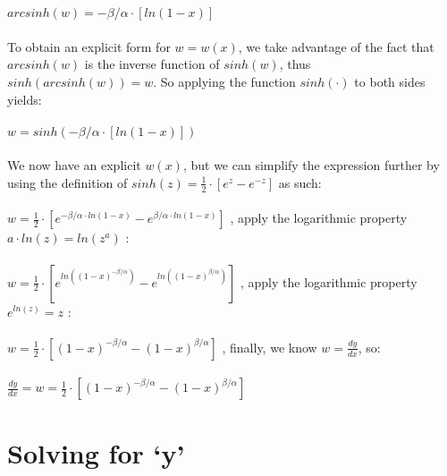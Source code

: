 \documentclass[12pt]{article}
\begin{document}
	\\
	\\
	$arcsinh(w)=-\beta/\alpha\cdot [ln(1-x)]$ 
	\\
	\\
	\clearpage
	\indent To obtain an explicit form for $w=w(x)$, we take advantage of the fact that $arcsinh(w)$ is the inverse function of $sinh(w)$, thus $sinh(arcsinh(w))=w$. So applying the function $sinh(\cdot)$ to both sides yields:
	\\
	\\
	$w=sinh(-\beta/\alpha\cdot [ln(1-x)])$
	\\
	\\
	\indent We now have an explicit $w(x)$, but we can simplify the expression further by using the definition of $sinh(z)=\frac{1}{2}\cdot[e^z - e^{-z}]$ as such:
	\\
	\\
	$w=\frac{1}{2}\cdot[e^{-\beta/\alpha\cdot ln(1-x)} - e^{\beta/\alpha\cdot ln(1-x)}]$ \hspace{1.15cm}, apply the logarithmic property $a\cdot ln(z)=ln(z^a)$ :
	\\
	\\
	$w=\frac{1}{2}\cdot[e^{ln((1-x)^{-\beta/\alpha})} - e^{ln((1-x)^{\beta/\alpha})}]$ \hspace{1cm}, apply the logarithmic property $e^{ln(z)}=z$ :
	\\
	\\
	$w=\frac{1}{2}\cdot[(1-x)^{-\beta/\alpha}-(1-x)^{\beta/\alpha}]$ \hspace{1.3cm}, finally, we know $w=\frac{dy}{dx}$, so:
	\\
	\\
	$\frac{dy}{dx}=w=\frac{1}{2}\cdot[(1-x)^{-\beta/\alpha}-(1-x)^{\beta/\alpha}]$
	\\
	
	
	\section{Solving for \textquoteleft y\textquoteright}
	
\end{document}
